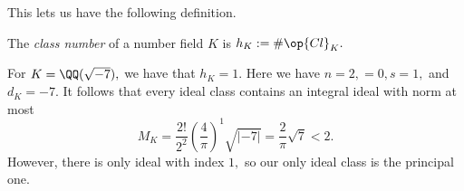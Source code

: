 This lets us have the following definition.
\begin{definition}
    The \textit{class number} of a number field $K$ is $h_K:=\#\op{Cl}_K.$
\end{definition}
\begin{example}
    For $K=\QQ(\sqrt{-7}),$ we have that $h_K=1.$ Here we have $n=2,=0,s=1,$ and $d_K=-7.$ It follows that every ideal class contains an integral ideal with norm at most
    \[M_K=\frac{2!}{2^2}\left(\frac4\pi\right)^1\sqrt{|-7|}=\frac2\pi\sqrt7<2.\]
    However, there is only ideal with index $1,$ so our only ideal class is the principal one.
\end{example}